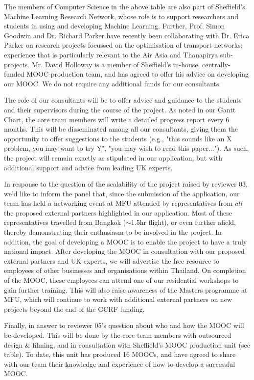 \documentclass[11pt]{article}
\begin{document}
\noindent
The members of Computer Science in the above table are also part of Sheffield's Machine Learning Research Network, whose role is to support researchers and students in using and developing Machine Learning. Further, Prof. Simon Goodwin and Dr. Richard Parker have recently been collaborating with Dr. Erica Parker on research projects focussed on the optimisation of transport networks; experience that is particularly relevant to the Air Asia and Thanapirya sub-projects. Mr. David Holloway is a member of Sheffield's in-house, centrally-funded MOOC-production team, and has agreed to offer his advice on developing our MOOC. We do not require any additional funds for our consultants.

\vspace{2mm}
\noindent
The role of our consultants will be to offer advice and guidance to the students and their supervisors during the course of the project. As noted in our Gantt Chart, the core team members will write a detailed progress report every 6 months. This will be disseminated among all our consultants, giving them the opportunity to offer suggestions to the students (e.g., "this sounds like an X problem, you may want to try Y", "you may wish to read this paper..."). As such, the project will remain exactly as stipulated in our application, but with additional support and advice from leading UK experts. 

\vspace{2mm}
\noindent
In response to the question of the scalability of the project raised by reviewer 03, we'd like to inform the panel that, since the submission of the application, our team has held a networking event at MFU attended by representatives from {\it all} the proposed external partners highlighted in our application. Most of these representatives travelled from Bangkok ($\sim$1.5hr flight), or even further afield, thereby demonstrating their enthusiasm to be involved in the project. In addition, the goal of developing a MOOC is to enable the project to have a truly national impact. After developing the MOOC in consultation with our proposed external partners and UK experts, we will advertise the free resource to employees of other businesses and organisations within Thailand. On completion of the MOOC, these employees can attend one of our residential workshops to gain further training. This will also raise awareness of the Masters programme at MFU, which will continue to work with additional external partners on new projects beyond the end of the GCRF funding.

\vspace{2mm}
\noindent
Finally, in answer to reviewer 05's question about who and how the MOOC will be developed. This will be done by the core team members with outsourced design \& filming, and in consultation with Sheffield's MOOC production unit (see table). To date, this unit has produced 16 MOOCs, and have agreed to share with our team their knowledge and experience of how to develop a successful MOOC.  
\end{document}

